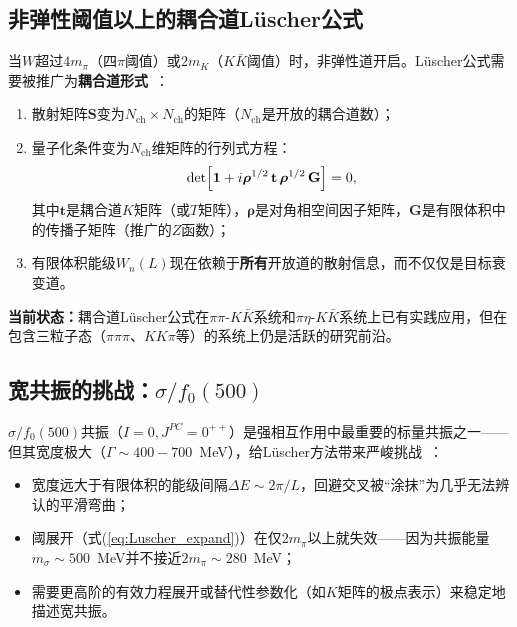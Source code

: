 \documentclass[12pt,a4paper]{ctexart}
\theoremstyle{definition}
\begin{document}
\subsection{非弹性阈值以上的耦合道L\"uscher公式}

当$W$超过$4m_\pi$（四$\pi$阈值）或$2m_K$（$K\bar{K}$阈值）时，非弹性道开启。L\"uscher公式需要被推广为\textbf{耦合道形式}~\cite{decayChannels2026}：

\begin{enumerate}[leftmargin=*]
    \item 散射矩阵$\mathbf{S}$变为$N_{\text{ch}} \times N_{\text{ch}}$的矩阵（$N_{\text{ch}}$是开放的耦合道数）；
    \item 量子化条件变为$N_{\text{ch}}$维矩阵的行列式方程：
    \begin{equation}\label{eq:coupled_det}
        \det\Bigl[ \mathbf{1} + i\boldsymbol{\rho}^{1/2}\,\mathbf{t}\,\boldsymbol{\rho}^{1/2}\,\mathbf{G} \Bigr] = 0,
    \end{equation}
    其中$\mathbf{t}$是耦合道$K$矩阵（或$T$矩阵），$\boldsymbol{\rho}$是对角相空间因子矩阵，$\mathbf{G}$是有限体积中的传播子矩阵（推广的$Z$函数）；
    \item 有限体积能级$W_n(L)$现在依赖于\textbf{所有}开放道的散射信息，而不仅仅是目标衰变道。
\end{enumerate}

\textbf{当前状态：}耦合道L\"uscher公式在$\pi\pi$-$K\bar{K}$系统和$\pi\eta$-$K\bar{K}$系统上已有实践应用，但在包含三粒子态（$\pi\pi\pi$、$KK\pi$等）的系统上仍是活跃的研究前沿。

\subsection{宽共振的挑战：$\sigma/f_0(500)$}

$\sigma/f_0(500)$共振（$I=0, J^{PC}=0^{++}$）是强相互作用中最重要的标量共振之一——但其宽度极大（$\Gamma \sim 400-700$~MeV），给L\"uscher方法带来严峻挑战~\cite{decayChannels2026}：

\begin{itemize}[leftmargin=*]
    \item 宽度远大于有限体积的能级间隔$\Delta E \sim 2\pi/L$，回避交叉被``涂抹''为几乎无法辨认的平滑弯曲；
    \item 阈展开（式(\ref{eq:Luscher_expand})）在仅$2m_\pi$以上就失效——因为共振能量$m_\sigma \sim 500$~MeV并不接近$2m_\pi \sim 280$~MeV；
    \item 需要更高阶的有效力程展开或替代性参数化（如$K$矩阵的极点表示）来稳定地描述宽共振。
\end{itemize}
\end{document}
